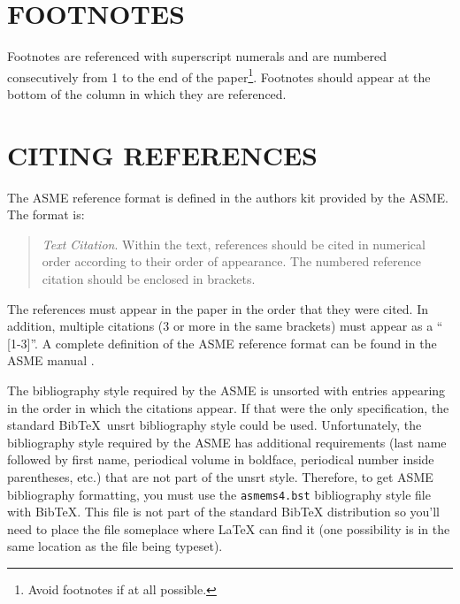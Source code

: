 \documentclass[twocolumn,10pt]{asme2e}
\begin{document}
{%
\section*{FOOTNOTES\protect\footnotemark}

Footnotes are referenced with superscript numerals and are numbered consecutively from 1 to the end of the paper\footnote{Avoid footnotes if at all possible.}. Footnotes should appear at the bottom of the column in which they are referenced.


\section*{CITING REFERENCES}

The ASME reference format is defined in the authors kit provided by the ASME.  The format is:

\begin{quotation}
{\em Text Citation}. Within the text, references should be cited in  numerical order according to their order of appearance.  The numbered reference citation should be enclosed in brackets.
\end{quotation}

The references must appear in the paper in the order that they were cited.  In addition, multiple citations (3 or more in the same brackets) must appear as a `` [1-3]''.  A complete definition of the ASME reference format can be found in the  ASME manual \cite{asmemanual}.

The bibliography style required by the ASME is unsorted with entries appearing in the order in which the citations appear. If that were the only specification, the standard {\sc Bib}\TeX\ unsrt bibliography style could be used. Unfortunately, the bibliography style required by the ASME has additional requirements (last name followed by first name, periodical volume in boldface, periodical number inside parentheses, etc.) that are not part of the unsrt style. Therefore, to get ASME bibliography formatting, you must use the \verb+asmems4.bst+ bibliography style file with {\sc Bib}\TeX. This file is not part of the standard BibTeX distribution so you'll need to place the file someplace where LaTeX can find it (one possibility is in the same location as the file being typeset).

}
\end{document}
